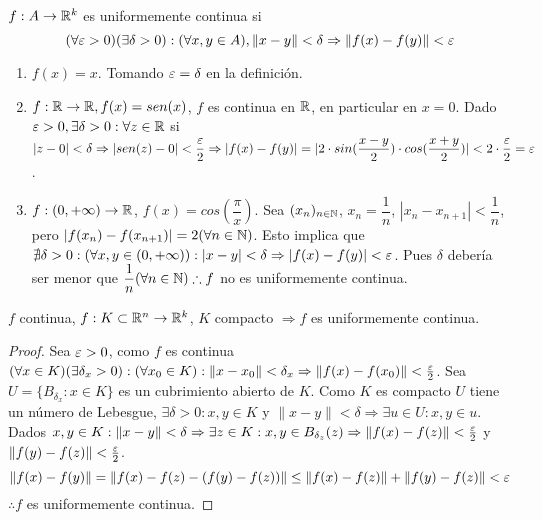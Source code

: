 \begin{definition}
  $f: A \to \mathbb{R}^k$ es uniformemente continua si \begin{equation}
    (\forall \varepsilon > 0)(\exists \delta > 0) : (\forall x,y \in A), \|x-y\| < \delta \Rightarrow \|f(x) - f(y)\| < \varepsilon
  \end{equation}
\end{definition}

\clearpage

\begin{eg}
  \begin{enumerate}
    \item $f(x) = x$. Tomando $\varepsilon = \delta$ en la definición.
    \item $f: \mathbb{R} \to \mathbb{R}, f(x) = sen(x)$, $f$ es continua en $\mathbb{R}$, en particular en $x = 0$. Dado $\varepsilon > 0, \exists \delta > 0 : \forall z \in \mathbb{R}$ si $|z-0| < \delta \Rightarrow |sen(z) - 0| < \dfrac{\varepsilon}{2} \Rightarrow |f(x) - f(y)| = |2 \cdot sin(\dfrac{x-y}{2}) \cdot cos(\dfrac{x+y}{2})| < 2 \cdot \dfrac{\varepsilon}{2} = \varepsilon$.
    \item $f: (0, +\infty) \to \mathbb{R}$, $f(x) = cos(\dfrac{\pi}{x})$. Sea $(x_n)_{n \in \mathbb{N}}$, $x_n = \dfrac{1}{n}$, $|x_n - x_{n+1}| < \dfrac{1}{n}$, pero $|f(x_n) - f(x_{n+1})| = 2 (\forall n \in \mathbb{N})$. Esto implica que $\nexists \delta > 0 : (\forall x,y \in (0, +\infty)) : |x-y| < \delta \Rightarrow |f(x) - f(y)| < \varepsilon$. Pues $\delta$ debería ser menor que $\dfrac{1}{n} (\forall n \in \mathbb{N}) \therefore f$ no es uniformemente continua.
  \end{enumerate}
\end{eg}

\begin{theorem}
  $f$ continua, $f: K \subset \mathbb{R}^n \to \mathbb{R}^k$, $K$ compacto $\Rightarrow f$ es uniformemente continua.
  \begin{proof}
    Sea $\varepsilon > 0$, como $f$ es continua $(\forall x \in K)(\exists \delta_x > 0) : (\forall x_0 \in K) : \|x - x_0\| < \delta_x \Rightarrow \|f(x) - f(x_0)\| < \frac{\varepsilon}{2}$. Sea $U = \{B_{\delta_x} : x \in K\}$ es un cubrimiento abierto de $K$. Como $K$ es compacto $U$ tiene un número de Lebesgue, $\exists \delta > 0 : x, y \in K$ y $ \|x-y\| < \delta \Rightarrow \exists u \in U : x, y \in u$. Dados $x, y \in K : \|x-y\| < \delta \Rightarrow \exists z \in K : x, y \in B_{\delta_z}(z) \Rightarrow \|f(x) - f(z)\| < \frac{\varepsilon}{2}$ y $\|f(y) - f(z)\| < \frac{\varepsilon}{2}$.
    \begin{equation}
      \|f(x) - f(y)\| = \|f(x) - f(z) - (f(y) - f(z))\| \leq \|f(x) - f(z)\| + \|f(y) - f(z)\| < \varepsilon
    \end{equation} $\therefore f$ es uniformemente continua.
  \end{proof}
\end{theorem}

